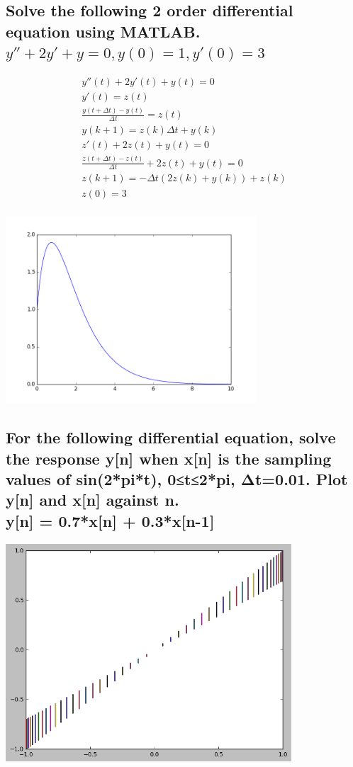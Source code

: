 \documentclass[12pt,a4paper]{article}
\begin{document}
\subsection{Solve the following 2 order differential equation using MATLAB.\\$	y'' +2y' +y = 0, y(0) = 1, y'(0) = 3$}
\begin{gather*}
y''(t) + 2y'(t) + y(t) = 0\\
y'(t) = z(t)\\
\frac{y(t+\Delta t) - y(t)}{\Delta t} = z(t)\\
y(k+1) = z(k)\Delta t + y(k)\\
z'(t) + 2z(t) + y(t) = 0\\
\frac{z(t+\Delta t) - z(t)}{\Delta t} + 2z(t) + y(t) = 0\\
z(k+1) = -\Delta t(2z(k) + y(k)) + z(k)\\ 
z(0) = 3\\
\end{gather*}

\includegraphics[width=0.7\textwidth]{1.png}
\subsection{For the following differential equation, solve the response y[n] when x[n] is the sampling values of sin(2*pi*t),  0≤t≤2*pi,  Δt=0.01.  Plot y[n] and x[n] against n.\\y[n] = 0.7*x[n] + 0.3*x[n-1]} 
\includegraphics[width=0.8\textwidth]{4.png}
\end{document}
